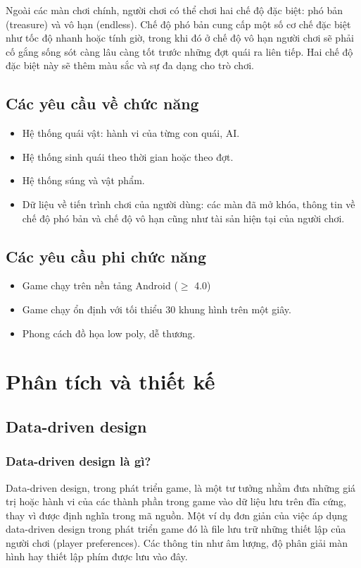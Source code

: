 \documentclass[12pt]{report}
\begin{document}
Ngoài các màn chơi chính, người chơi có thể chơi hai chế độ đặc biệt: phó bản (treasure) và vô hạn (endless). Chế độ phó bản cung cấp một số cơ chế đặc biệt như tốc độ nhanh hoặc tính giờ, trong khi đó ở chế độ vô hạn người chơi sẽ phải cố gắng sống sót càng lâu càng tốt trước những đợt quái ra liên tiếp. Hai chế độ đặc biệt này sẽ thêm màu sắc và sự đa dạng cho trò chơi.
\section{Các yêu cầu về chức năng}
\begin{itemize}
	\item Hệ thống quái vật: hành vi của từng con quái, AI.
	\item Hệ thống sinh quái theo thời gian hoặc theo đợt.
	\item Hệ thống súng và vật phẩm.
	\item Dữ liệu về tiến trình chơi của người dùng: các màn đã mở khóa, thông tin về chế độ phó bản và chế độ vô hạn cũng như tài sản hiện tại của người chơi.
\end{itemize}

\section{Các yêu cầu phi chức năng}
\begin{itemize}
	\item Game chạy trên nền tảng Android ($\geqslant$ 4.0)
	\item Game chạy ổn định với tối thiểu 30 khung hình trên một giây.
	\item Phong cách đồ họa low poly, dễ thương.
\end{itemize}

\chapter{Phân tích và thiết kế}
\section{Data-driven design}
\subsection{Data-driven design là gì?}
Data-driven design, trong phát triển game, là một tư tưởng nhằm đưa những giá trị hoặc hành vi của các thành phần trong game vào dữ liệu lưu trên đĩa cứng, thay vì được định nghĩa trong mã nguồn. Một ví dụ đơn giản của việc áp dụng data-driven design trong phát triển game đó là file lưu trữ những thiết lập của người chơi (player preferences). Các thông tin như âm lượng, độ phân giải màn hình hay thiết lập phím được lưu vào đây.
\end{document}
